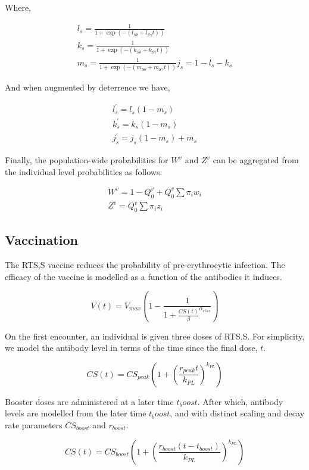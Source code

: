 \documentclass{bmcart}
\begin{document}
Where,

\begin{gather*}
    l_s = \frac{1}{1 + \exp(-(l_{S\theta} + l_{S\gamma} t))}\\
    k_s = \frac{1}{1 + \exp(-(k_{S\theta} + k_{S\gamma} t))}\\
    m_s = \frac{1}{1 + \exp(-(m_{S\theta} + m_{S\gamma} t))}
    j_s = 1 - l_s - k_s
\end{gather*}

And when augmented by deterrence we have,

\begin{gather*}
    l_s^\prime = l_s (1 - m_s)\\
    k_s^\prime = k_s (1 - m_s)\\
    j_s^\prime = j_s (1 - m_s) + m_s
\end{gather*}

Finally, the population-wide probabilities for $W^v$ and $Z^v$ can be aggregated from the individual level probabilities as follows:

\begin{gather*}
W^v = 1 - Q^v_0 + Q^v_0 \sum\pi_iw_i\\
Z^v = Q^v_0 \sum\pi_iz_i
\end{gather*}

\subsection*{Vaccination}

The RTS,S vaccine reduces the probability of pre-erythrocytic infection. The efficacy of the vaccine is modelled as a function of the antibodies it induces.

\[
V(t) = V_{max}\left(1 - \frac{1}{1 + \frac{CS(t)}{\beta}^{\alpha_{rtss}}}\right)
\]

On the first encounter, an individual is given three doses of RTS,S. For simplicity, we model the antibody level in terms of the time since the final dose, $t$.

\[
CS(t) = CS_{peak}\left(1 + \left(\frac{r_{peak}t}{k_{PL}}\right)^{k_{PL}}\right)
\]

Booster doses are administered at a later time $t_boost$. After which, antibody levels are modelled from the later time $t_boost$, and with distinct scaling and decay rate parameters $CS_{boost}$ and $r_{boost}$.

\[
CS(t) = CS_{boost}\left(1 + \left(\frac{r_{boost}(t - t_{boost})}{k_{PL}}\right)^{k_{PL}}\right)
\]
\end{document}
